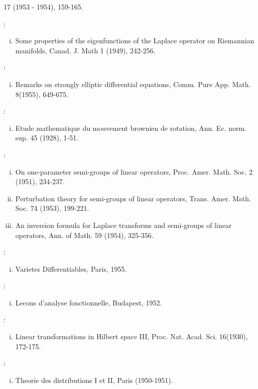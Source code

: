 \begin{thebibliography}{99}
\begin{enumerate}[(i)]
  17 (1953 - 1954), 159-165. 
 \end{enumerate}
: 
 \begin{enumerate}[(i)]
 \item Some properties of the eigenfunctions of the Laplace operator
  on Riemannian manifolds, Canad. J. Math 1 (1949), 242-256. 
 \end{enumerate}
: 
 \begin{enumerate}[(i)]
 \item Remarks on strongly elliptic differential equations,
  Comm. Pure App. Math. 8(1955), 649-675. 
 \end{enumerate}
: 
 \begin{enumerate}[(i)]
 \item Etude mathematique du mouvement brownien de rotation,
  Ann. Ec. norm. sup. 45 (1928), 1-51. 
 \end{enumerate}
: 
 \begin{enumerate}[(i)]
 \item On one-parameter semi-groups of linear operators,
  Proc. Amer. Math. Soc. 2 (1951), 234-237. 
 \item Perturbation theory for semi-groups of linear operators,
  Trans. Amer. Math. Soc. 74 (1953), 199-221. 
 \item An inversion formula for Laplace transforms and semi-groups of
  linear operators, Ann. of Math. 59 (1954), 325-356. 
 \end{enumerate}
:\pageoriginale 
 \begin{enumerate}[(i)]
 \item Varietes Differentiables, Paris, 1955.
 \end{enumerate}
: 
 \begin{enumerate}[(i)]
 \item Lecons d'analyse fonctionnelle, Budapest, 1952.
 \end{enumerate}
: 
 \begin{enumerate}[(i)]
 \item Linear transformations in Hilbert space III,
  Proc. Nat. Acad. Sci. 16(1930), 172-175. 
 \end{enumerate}
: 
 \begin{enumerate}[(i)]
 \item Theorie des distributions I et II, Paris (1950-1951).

\end{enumerate}
\end{thebibliography}
